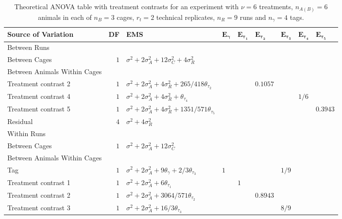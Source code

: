 \begin{landscape}
\begin{table}[ht]
\centering
 \caption{Theoretical ANOVA table with treatment contrasts for an experiment with $\nu = 6$ treatments, $n_{A(B)} = 6$ animals in each of  $n_B = 3$ cages, $r_t = 2$ technical replicates, $n_R = 9$ runs and $n_\gamma = 4$ tags.}
 \begin{tabular}{lrlllllll} 
 \toprule 
 \multicolumn{1}{l}{\textbf{Source of Variation}} & \multicolumn{1}{l}{\textbf{DF}} & \multicolumn{1}{l}{\textbf{EMS}}& \multicolumn{1}{l}{$\bm{E_{\gamma}}$}&\multicolumn{1}{l}{$\bm{E_{\tau_1}}$}&\multicolumn{1}{l}{$\bm{E_{\tau_2}}$}&\multicolumn{1}{l}{$\bm{E_{\tau_3}}$}&\multicolumn{1}{l}{$\bm{E_{\tau_4}}$}&\multicolumn{1}{l}{$\bm{E_{\tau_5}}$}\\ 
 \midrule 
 Between Runs &  &  & &  &  &  &  & \\ 
 \quad Between Cages & $1$ & $\sigma^2+2\sigma_{A}^2+12\sigma_{C}^2+4\sigma_{R}^2$ & &  &  &  &  & \\ \hline
 \quad Between Animals Within Cages &  &  & &  &  &  &  & \\ 
 \quad \quad Treatment contrast 2 & $1$ & $\sigma^2+2\sigma_{A}^2+4\sigma_{R}^2+265/418\theta_{\tau_2}$ & &  & $0.1057$ &  &  & \\ 
 \quad \quad Treatment contrast 4 & $1$ & $\sigma^2+2\sigma_{A}^2+4\sigma_{R}^2+\theta_{\tau_4}$ & &  &  &  & $1/6$ & \\ 
 \quad \quad Treatment contrast 5 & $1$ & $\sigma^2+2\sigma_{A}^2+4\sigma_{R}^2+1351/571\theta_{\tau_5}$ & &  &  &  &  & $0.3943$\\ 
 \quad Residual & $4$ & $\sigma^2+4\sigma_{R}^2$ & &  &  &  &  & \\ \hline
 Within Runs &  &  & &  &  &  &  & \\ 
 \quad Between Cages & $1$ & $\sigma^2+2\sigma_{A}^2+12\sigma_{C}^2$ & &  &  &  &  & \\ \hline
 \quad Between Animals Within Cages &  &  & &  &  &  &  & \\ 
 \quad \quad Tag & $1$ & $\sigma^2+2\sigma_{A}^2+9\theta_{\gamma}+2/3\theta_{\tau_3}$ &$1$ &  &  & $1/9$ &  & \\ 
 \quad \quad Treatment contrast 1 & $1$ & $\sigma^2+2\sigma_{A}^2+6\theta_{\tau_1}$ & & $1$ &  &  &  & \\ 
 \quad \quad Treatment contrast 2 & $1$ & $\sigma^2+2\sigma_{A}^2+3064/571\theta_{\tau_2}$ & &  & $0.8943$ &  &  & \\ 
 \quad \quad Treatment contrast 3 & $1$ & $\sigma^2+2\sigma_{A}^2+16/3\theta_{\tau_3}$ & &  &  & $8/9$ &  & \\ 

\end{tabular}
\end{table}
\end{landscape}
